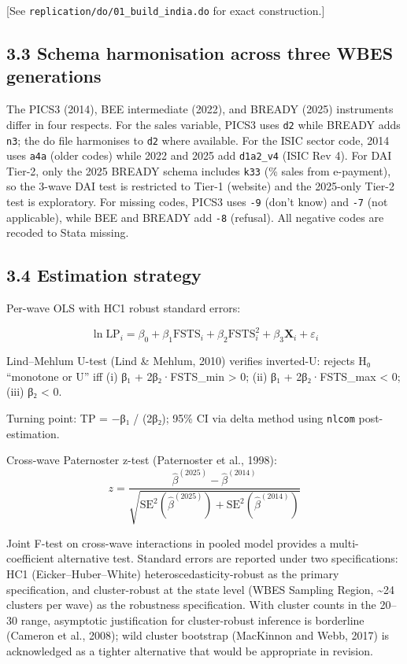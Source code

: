 \documentclass[
  12pt]{article}
\begin{document}
{[}See \texttt{replication/do/01\_build\_india.do} for exact
construction.{]}

\hypertarget{schema-harmonisation-across-three-wbes-generations}{%
\subsection{3.3 Schema harmonisation across three WBES
generations}\label{schema-harmonisation-across-three-wbes-generations}}

The PICS3 (2014), BEE intermediate (2022), and BREADY (2025) instruments
differ in four respects. For the sales variable, PICS3 uses \texttt{d2}
while BREADY adds \texttt{n3}; the do file harmonises to \texttt{d2}
where available. For the ISIC sector code, 2014 uses \texttt{a4a} (older
codes) while 2022 and 2025 add \texttt{d1a2\_v4} (ISIC Rev 4). For DAI
Tier-2, only the 2025 BREADY schema includes \texttt{k33} (\% sales from
e-payment), so the 3-wave DAI test is restricted to Tier-1 (website) and
the 2025-only Tier-2 test is exploratory. For missing codes, PICS3 uses
\texttt{-9} (don't know) and \texttt{-7} (not applicable), while BEE and
BREADY add \texttt{-8} (refusal). All negative codes are recoded to
Stata missing.

\hypertarget{estimation-strategy}{%
\subsection{3.4 Estimation strategy}\label{estimation-strategy}}

Per-wave OLS with HC1 robust standard errors:

\[\ln \text{LP}_i = \beta_0 + \beta_1 \text{FSTS}_i + \beta_2 \text{FSTS}^2_i + \beta_3 \mathbf{X}_i + \varepsilon_i\]

Lind--Mehlum U-test (Lind \& Mehlum, 2010) verifies inverted-U: rejects
H₀ ``monotone or U'' iff (i) β₁ + 2β₂·FSTS\_min \textgreater{} 0; (ii)
β₁ + 2β₂·FSTS\_max \textless{} 0; (iii) β₂ \textless{} 0.

Turning point: TP = −β₁ / (2β₂); 95\% CI via delta method using
\texttt{nlcom} post-estimation.

Cross-wave Paternoster z-test (Paternoster et al., 1998):
\[z = \frac{\hat\beta^{(2025)} - \hat\beta^{(2014)}}{\sqrt{\text{SE}^2(\hat\beta^{(2025)}) + \text{SE}^2(\hat\beta^{(2014)})}}\]

Joint F-test on cross-wave interactions in pooled model provides a
multi-coefficient alternative test. Standard errors are reported under
two specifications: HC1 (Eicker--Huber--White) heteroscedasticity-robust
as the primary specification, and cluster-robust at the state level
(WBES Sampling Region, \textasciitilde24 clusters per wave) as the
robustness specification. With cluster counts in the 20--30 range,
asymptotic justification for cluster-robust inference is borderline
(Cameron et al., 2008); wild cluster bootstrap (MacKinnon and Webb,
2017) is acknowledged as a tighter alternative that would be appropriate
in revision.
\end{document}
